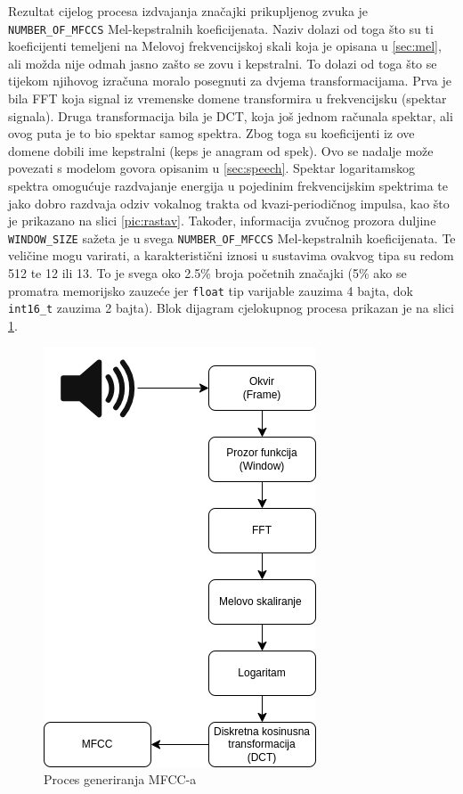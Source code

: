 Rezultat cijelog procesa izdvajanja značajki prikupljenog zvuka je \texttt{NUMBER\_OF\_MFCCS} Mel-kepstralnih
koeficijenata. Naziv dolazi od toga što su ti koeficijenti temeljeni na Melovoj frekvencijskoj
skali koja je opisana u \ref{sec:mel}, ali možda nije odmah jasno zašto se zovu i kepstralni.
To dolazi od toga što se tijekom njihovog izračuna moralo posegnuti za dvjema transformacijama.
Prva je bila FFT koja signal iz vremenske domene transformira u frekvencijsku (spektar
signala). Druga transformacija bila je DCT, koja još jednom računala spektar, ali
ovog puta je to bio spektar samog spektra. Zbog toga su koeficijenti iz ove domene dobili ime
kepstralni (keps je anagram od spek). Ovo se nadalje može povezati s modelom govora opisanim
u \ref{sec:speech}. Spektar logaritamskog spektra omogućuje razdvajanje energija u pojedinim 
frekvencijskim spektrima te jako dobro razdvaja odziv vokalnog trakta od kvazi-periodičnog
impulsa, kao što je prikazano na slici \ref{pic:rastav}. Također, informacija zvučnog
prozora duljine \texttt{WINDOW\_SIZE} sažeta je
u svega \texttt{NUMBER\_OF\_MFCCS} Mel-kepstralnih koeficijenata. Te veličine mogu varirati, a
karakteristični iznosi u sustavima ovakvog tipa su redom 512 te 12 ili 13. To je svega
oko 2.5\% 
broja početnih značajki (5\% ako se promatra memorijsko zauzeće jer \texttt{float} tip varijable
zauzima 4 bajta, dok \texttt{int16\_t} zauzima 2 bajta). Blok dijagram cjelokupnog procesa prikazan
je na slici \ref{pic:generation}.

\begin{figure}[htb]
    \centering
    \includegraphics[width=0.4\linewidth]{Chapters/struktura_sustava/generiranje_znacajki/generation.png} 
    \caption{Proces generiranja MFCC-a \cite{flowchart}}
    \label{pic:generation}
\end{figure}

